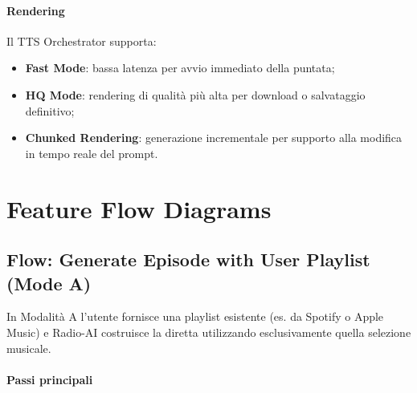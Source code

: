 \documentclass[11pt,a4paper]{article}
\begin{document}
\paragraph{Rendering}

Il TTS Orchestrator supporta:
\begin{itemize}
    \item \textbf{Fast Mode}: bassa latenza per avvio immediato della puntata;
    \item \textbf{HQ Mode}: rendering di qualità più alta per download o salvataggio definitivo;
    \item \textbf{Chunked Rendering}: generazione incrementale per supporto alla modifica in tempo reale del prompt.
\end{itemize}
\section{Feature Flow Diagrams}

\subsection{Flow: Generate Episode with User Playlist (Mode A)}

In Modalità A l'utente fornisce una playlist esistente (es. da Spotify o Apple Music) e Radio-AI costruisce la diretta utilizzando esclusivamente quella selezione musicale.

\paragraph{Passi principali}
\end{document}
